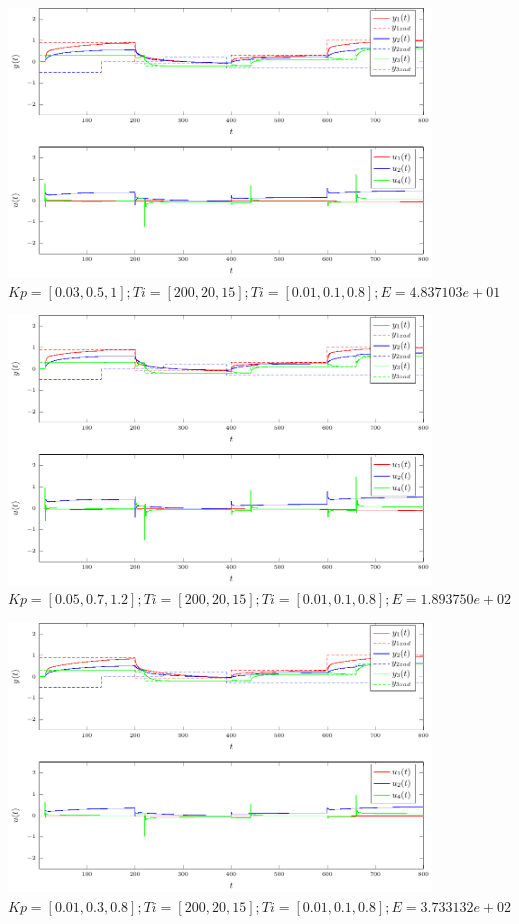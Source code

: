 \documentclass[a4paper,titlepage,11pt,twosides,floatssmall]{mwrep}
\begin{document}
\begin{figure}[H]
	\centering
	\includegraphics[scale=1]{../wykresy/zad4_pid_3_1.pdf}
	\caption{$Kp = [0.03, 0.5, 1]; Ti = [200, 20, 15]; Ti = [0.01, 0.1, 0.8]; E = 4.837103e+01$}
\end{figure}

\begin{figure}[H]
	\centering
	\includegraphics[scale=1]{../wykresy/zad4_pid_3_2.pdf}
	\caption{$Kp = [0.05, 0.7, 1.2]; Ti = [200, 20, 15]; Ti = [0.01, 0.1, 0.8]; E = 1.893750e+02$}
\end{figure}

\begin{figure}[H]
	\centering
	\includegraphics[scale=1]{../wykresy/zad4_pid_3_3.pdf}
	\caption{$Kp = [0.01, 0.3, 0.8]; Ti = [200, 20, 15]; Ti = [0.01, 0.1, 0.8]; E = 3.733132e+02$}
\end{figure}
\end{document}
